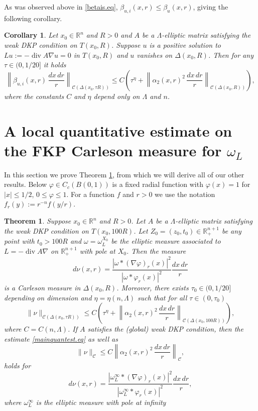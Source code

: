 \documentclass[11pt, a4paper,leqno]{amsart}
\theoremstyle{plain}
\newtheorem{theorem}[equation]{Theorem}
\newtheorem{corollary}[equation]{Corollary}
\theoremstyle{definition}
\theoremstyle{remark}
\numberwithin{equation}{section}
\newcommand{\ree}{\mathbb{R}^{n+1}}
\newcommand{\hm}{\omega}
\def\div{\mathop{\operatorname{div}}\nolimits}
\begin{document}
As was observed above in \eqref{betais.eq}, $\beta_{u,i}(x,r) \le \beta_u(x,r)$, giving the following corollary.

\begin{corollary}\label{xengy.cor}
Let $x_0 \in \mathbb{R}^n$ and $R > 0$ and $A$ be a $\Lambda$-elliptic matrix satisfying the weak DKP condition on $T(x_0,R)$. Suppose $u$ is a positive solution to $L u := -\div A \nabla u = 0$ in $T(x_0, R)$ and $u$ vanishes on $\Delta(x_0,R)$. Then for any $\tau \in (0,1/20]$ it holds
\[\left\|\beta_{u,i}(x,r) \, \frac{dx\, dr}{r}\right\|_{\mathcal{C}(\Delta(x_0,\tau R))} \le C\left(\tau^\eta  + \left\|\alpha_2(x,r)^2 \, \frac{dx\, dr}{r}\right\|_{\mathcal{C}(\Delta(x_0, R))}\right),\]
where the constants $C$ and $\eta$ depend only on $\Lambda$ and $n$.
\end{corollary}

\section{A local quantitative estimate on the FKP Carleson measure for $\hm_L$}\label{quantest.sect}
In this section we prove Theorem \ref{mainquantest.thrm}, from which we will derive all of our other results. Below $\varphi \in C_c(B(0,1))$ is a fixed radial function with $\varphi(x) = 1$ for $|x| \le 1/2$, $0 \le \varphi \le 1$. For a function $f$  and $r > 0$ we use the notation $f_r(y) := r^{-n}f(y/r)$.


\begin{theorem}\label{mainquantest.thrm}
Suppose $x_0 \in \mathbb{R}^n$ and $R > 0$. Let $A$ be a $\Lambda$-elliptic matrix satisfying the weak DKP condition on $T(x_0, 100 R)$. Let $Z_0 = (z_0,t_0)\in  \ree_+ $ be any point with $t_0 > 100R$ and  $\omega = \omega^{X_0}_L$ be the elliptic measure associated to $L = -\div A \nabla$ on $\mathbb{R}^{n+1}_+$ with pole at $X_0$. 
Then the measure
\[d\nu(x,r) = \frac{|\omega \ast (\nabla \varphi)_r(x)|^2}{|\omega \ast \varphi_r(x)|^2} \frac{dx \, dr}{r}\]
is a Carleson measure in $\Delta(x_0,R)$. Moreover, there exists $\tau_0  \in (0,1/20]$ depending on dimension and $\eta = \eta(n, \Lambda)$ such that for all $\tau \in (0,\tau_0)$
\begin{equation}\label{mainquantest.eq}
\|\nu\|_{\mathcal{C}(\Delta(x_0,\tau R))} \le C\left(\tau^\eta +  \left\|\alpha_2(x,r)^2 \, \frac{dx\, dr}{r}\right\|_{\mathcal{C}(\Delta(x_0, 100 R))}\right),
\end{equation}
where $C = C(n, \Lambda)$.
If $A$ satisfies the (global) weak DKP condition, then the estimate \eqref{mainquantest.eq} as well as 
\begin{equation}\label{mainquantest2.eq}
\|\nu\|_{\mathcal{C}} \le C\left\|\alpha_2(x,r)^2 \, \frac{dx\, dr}{r}\right\|_{\mathcal{C}},
\end{equation}
holds for
\[d\nu(x,r) = \frac{|\omega_L^\infty \ast (\nabla \varphi)_r(x)|^2}{|\omega_L^\infty \ast \varphi_r(x)|^2} \frac{dx \, dr}{r},\]
where $\omega_L^\infty$ is the elliptic measure with pole at infinity 
\end{theorem}
\end{document}
